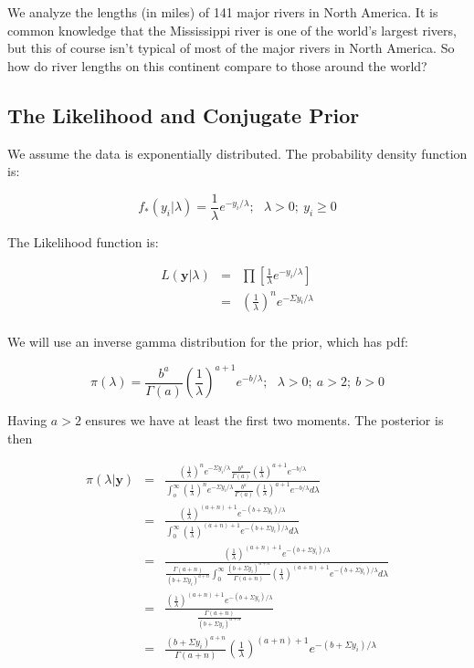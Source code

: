 \documentclass[12pt]{article}
\begin{document}
\noindent We analyze the lengths (in miles) of 141 major rivers in North America.  It is common knowledge that the Mississippi river is one of the world's largest rivers, but this of course isn't typical of most of the major rivers in North America.  So how do river lengths on this continent compare to those around the world?

\subsection{The Likelihood and Conjugate Prior}

\noindent We assume the data is exponentially distributed.  The probability density function is:

\[f_*(y_i|\lambda)=\frac{1}{\lambda}e^{-y_i/\lambda};\ \ \ \lambda>0;\ y_i\geq 0 \]

\noindent The Likelihood function is:

\begin{eqnarray*}
L(\mathbf{y}|\lambda) &=& \prod\left[\frac{1}{\lambda}e^{-y_i/\lambda}\right] \\
&=& \left(\frac{1}{\lambda}\right)^ne^{-\Sigma y_i/\lambda} \\
\end{eqnarray*}

\noindent We will use an inverse gamma distribution for the prior, which has pdf:

\[\pi(\lambda)=\frac{b^a}{\Gamma(a)}\left(\frac{1}{\lambda}\right)^{a+1}e^{-b/\lambda};\ \ \ \lambda>0;\ a>2;\ b>0\]

\noindent Having $a>2$ ensures we have at least the first two moments. The posterior is then

\begin{eqnarray*}
\pi(\lambda|\mathbf{y}) &=& \frac{\left(\frac{1}{\lambda}\right)^ne^{-\Sigma y_i/\lambda}\frac{b^a}{\Gamma(a)}\left(\frac{1}{\lambda}\right)^{a+1}e^{-b/\lambda}}{\int_o^\infty \left(\frac{1}{\lambda}\right)^ne^{-\Sigma y_i/\lambda}\frac{b^a}{\Gamma(a)}\left(\frac{1}{\lambda}\right)^{a+1}e^{-b/\lambda}d\lambda} \\
&=& \frac{\left(\frac{1}{\lambda}\right)^{(a+n)+1}e^{-(b+\Sigma y_i)/\lambda}}{\int_0^\infty \left(\frac{1}{\lambda}\right)^{(a+n)+1}e^{-(b+\Sigma y_i)/\lambda}d\lambda} \\
&=& \frac{\left(\frac{1}{\lambda}\right)^{(a+n)+1}e^{-(b+\Sigma y_i)/\lambda}}{\frac{\Gamma(a+n)}{(b+\Sigma y_i)^{a+n}}\int_0^\infty \frac{(b+\Sigma y_i)^{a+n}}{\Gamma(a+n)}\left(\frac{1}{\lambda}\right)^{(a+n)+1}e^{-(b+\Sigma y_i)/\lambda}d\lambda} \\
&=& \frac{\left(\frac{1}{\lambda}\right)^{(a+n)+1}e^{-(b+\Sigma y_i)/\lambda}}{\frac{\Gamma(a+n)}{(b+\Sigma y_i)^{a+n}}} \\
&=& \frac{(b+\Sigma y_i)^{a+n}}{\Gamma(a+n)}\left(\frac{1}{\lambda}\right)^{(a+n)+1}e^{-(b+\Sigma y_i)/\lambda} \\
\end{eqnarray*}
\end{document}
